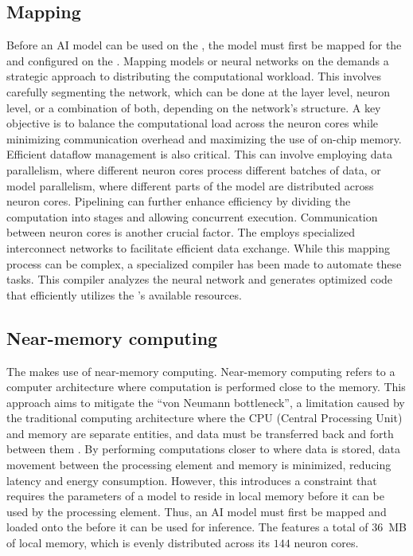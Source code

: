 \subsection{Mapping}
Before an AI model can be used on the \graicore{}, the model must first be mapped for the \graicore{} and configured on the \graicore{}.
Mapping models or neural networks on the \graicore{} demands a strategic approach to distributing the computational workload.
This involves carefully segmenting the network, which can be done at the layer level, neuron level, or a combination of both, depending on the network's structure. 
A key objective is to balance the computational load across the neuron cores while minimizing communication overhead and maximizing the use of on-chip memory.
Efficient dataflow management is also critical.
This can involve employing data parallelism, where different neuron cores process different batches of data, or model parallelism, where different parts of the model are distributed across neuron cores.
Pipelining can further enhance efficiency by dividing the computation into stages and allowing concurrent execution.
Communication between neuron cores is another crucial factor.
The \graicore{} employs specialized interconnect networks to facilitate efficient data exchange.
While this mapping process can be complex, a specialized compiler has been made to automate these tasks.
This compiler analyzes the neural network and generates optimized code that efficiently utilizes the \graicore{}'s available resources.

\subsection{Near-memory computing}
The \graicore{} makes use of near-memory computing.
Near-memory computing refers to a computer architecture where computation is performed close to the memory.
This approach aims to mitigate the ``von Neumann bottleneck'', a limitation caused by the traditional computing architecture where the CPU (Central Processing Unit) and memory are separate entities, and data must be transferred back and forth between them \cite{indiveriMemoryInformationProcessing2015}.
By performing computations closer to where data is stored, data movement between the processing element and memory is minimized, reducing latency and energy consumption.
However, this introduces a constraint that requires the parameters of a model to reside in local memory before it can be used by the processing element.
Thus, an AI model must first be mapped and loaded onto the \graicore{} before it can be used for inference.
The \graicore{} features a total of \SI{36}{MB} of local memory, which is evenly distributed across its $144$ neuron cores.

